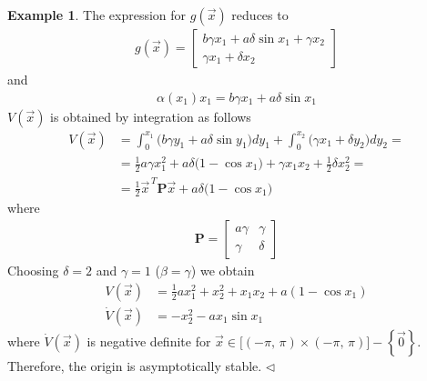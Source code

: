 \documentclass[11pt,a4paper,oneside]{book}
\numberwithin{equation}{section}
\theoremstyle{it}
\theoremstyle{definition}
\newtheorem{example}{Example}[chapter]
\begin{document}
\begin{example}
	The expression for $g(\vec{x})$ reduces to
	\begin{equation*}
		\begin{aligned}
			g(\vec{x}) = \begin{bmatrix}
				b\gamma x_1+a\delta\sin x_1+\gamma x_2 \\[6pt] \gamma x_1 
				+\delta x_2 \end{bmatrix}
		\end{aligned}
	\end{equation*}
	and
	\begin{equation*}
		\begin{aligned}
			\alpha(x_1)x_1 = b\gamma x_1+a\delta\sin x_1
		\end{aligned}
	\end{equation*}
	$V(\vec{x})$ is obtained by integration as follows
	\begin{equation*}
		\begin{aligned}
			V(\vec{x}) &= \int_{0}^{x_1}\Big(b\gamma y_1+a\delta\sin 
			y_1\Big)dy_1+\int_{0}^{x_2}\Big(\gamma x_1+\delta y_2\Big)dy_2 = 
			\\[8pt]
			&=\frac{1}{2}a\gamma x_1^2+a\delta\big(1-\cos x_1\big)+\gamma 
			x_1x_2+\frac{1}{2}\delta x_2^2 = \\[6pt]
			&= \frac{1}{2}\vec{x}^{\,T}\mathbf{P}\vec{x}+a\delta\big(1-\cos 
			x_1\big)
		\end{aligned}
	\end{equation*}
	where
	\begin{equation*}
		\begin{aligned}
			\mathbf{P}=\begin{bmatrix} a\gamma & \gamma \\[6pt] \gamma & \delta 
			\end{bmatrix}
		\end{aligned}
	\end{equation*}
	Choosing $\delta=2$ and $\gamma = 1$ ($\beta=\gamma$) we obtain
	\begin{equation*}
		\begin{aligned}
			V(\vec{x}) &= \frac{1}{2}ax_1^2+x_2^2+x_1x_2+a(1-\cos x_1) \\[6pt]
			\dot{V}(\vec{x}) &= -x_2^2-ax_1\sin x_1
		\end{aligned}
	\end{equation*}
	where $\dot{V}(\vec{x})$ is negative definite for 
	$\vec{x}\in\Big[(-\pi,\,\pi)\times (-\pi,\,\pi)\Big]-\left\lbrace 
	\vec{0}\right\rbrace $. Therefore, the origin is asymptotically stable.
	$\triangleleft$
\end{example}
\end{document}

